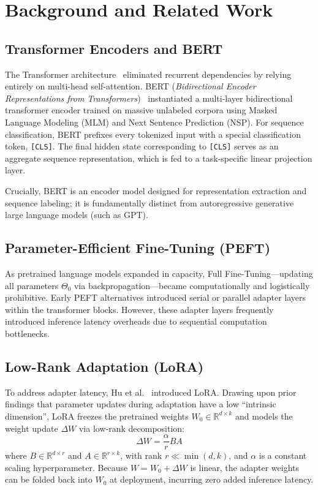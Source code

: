 \documentclass[conference]{IEEEtran}
\begin{document}
\section{Background and Related Work}
\label{sec:background}

\subsection{Transformer Encoders and BERT}
The Transformer architecture~\cite{vaswani2017attention} eliminated recurrent dependencies by relying entirely on multi-head self-attention. BERT (\textit{Bidirectional Encoder Representations from Transformers})~\cite{devlin2019bert} instantiated a multi-layer bidirectional transformer encoder trained on massive unlabeled corpora using Masked Language Modeling (MLM) and Next Sentence Prediction (NSP). For sequence classification, BERT prefixes every tokenized input with a special classification token, \texttt{[CLS]}. The final hidden state corresponding to \texttt{[CLS]} serves as an aggregate sequence representation, which is fed to a task-specific linear projection layer.

Crucially, BERT is an encoder model designed for representation extraction and sequence labeling; it is fundamentally distinct from autoregressive generative large language models (such as GPT).

\subsection{Parameter-Efficient Fine-Tuning (PEFT)}
As pretrained language models expanded in capacity, Full Fine-Tuning—updating all parameters $\Theta_0$ via backpropagation—became computationally and logistically prohibitive. Early PEFT alternatives introduced serial or parallel adapter layers within the transformer blocks. However, these adapter layers frequently introduced inference latency overheads due to sequential computation bottlenecks.

\subsection{Low-Rank Adaptation (LoRA)}
To address adapter latency, Hu et al.~\cite{hu2022lora} introduced LoRA. Drawing upon prior findings that parameter updates during adaptation have a low ``intrinsic dimension'', LoRA freezes the pretrained weights $W_0 \in \mathbb{R}^{d \times k}$ and models the weight update $\Delta W$ via low-rank decomposition:
\begin{equation}
\Delta W = \frac{\alpha}{r} B A
\end{equation}
where $B \in \mathbb{R}^{d \times r}$ and $A \in \mathbb{R}^{r \times k}$, with rank $r \ll \min(d, k)$, and $\alpha$ is a constant scaling hyperparameter. Because $W = W_0 + \Delta W$ is linear, the adapter weights can be folded back into $W_0$ at deployment, incurring zero added inference latency.
\end{document}
